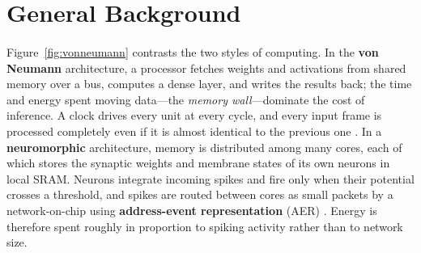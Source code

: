 \documentclass[12pt,a4paper,final]{extreport}
\begin{document}
\section{General Background}

\paragraph{} Figure~\ref{fig:vonneumann} contrasts the two styles of computing. In the \textbf{von Neumann} architecture, a processor fetches weights and activations from shared memory over a bus, computes a dense layer, and writes the results back; the time and energy spent moving data---the \emph{memory wall}---dominate the cost of inference. A clock drives every unit at every cycle, and every input frame is processed completely even if it is almost identical to the previous one \cite{p4}. In a \textbf{neuromorphic} architecture, memory is distributed among many cores, each of which stores the synaptic weights and membrane states of its own neurons in local SRAM. Neurons integrate incoming spikes and fire only when their potential crosses a threshold, and spikes are routed between cores as small packets by a network-on-chip using \textbf{address-event representation} (AER) \cite{p3}. Energy is therefore spent roughly in proportion to spiking activity rather than to network size.
\end{document}
